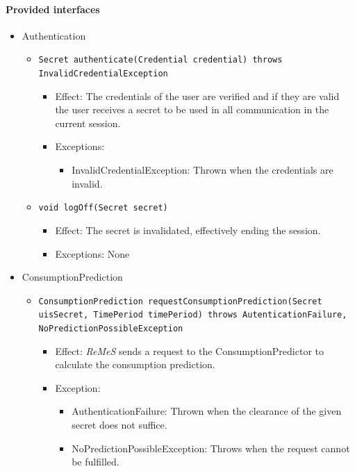 \documentclass[a4paper,10pt]{article}
\newcommand{\rem}{\emph{ReMeS}\xspace}
\begin{document}
\paragraph{Provided interfaces}
\begin{itemize}
    \item Authentication
    \begin{itemize}
    	\item \texttt{Secret authenticate(Credential credential) throws InvalidCredentialException}
        \begin{itemize}
        	\item Effect: The credentials of the user are verified and if they are valid the user receives a secret to be used in all communication in the current session.
            \item Exceptions:
            \begin{itemize}
            	\item InvalidCredentialException: Thrown when the credentials are invalid.
           	\end{itemize}
        \end{itemize}
        \item \texttt{void logOff(Secret secret)}
        \begin{itemize}
        	\item Effect: The secret is invalidated, effectively ending the session.
            \item Exceptions: None
        \end{itemize}
    \end{itemize}
    
        \item ConsumptionPrediction
    \begin{itemize}
    	\item \texttt{ConsumptionPrediction requestConsumptionPrediction(Secret uisSecret, TimePeriod timePeriod) throws AutenticationFailure,	NoPredictionPossibleException}
        \begin{itemize}
        	\item Effect: \rem sends a request to the ConsumptionPredictor to calculate the consumption prediction.
            \item Exception:
            \begin{itemize}
      		    \item AuthenticationFailure: Thrown when the clearance of the given secret does not suffice.
            	\item NoPredictionPossibleException: Throws when the request cannot be fulfilled.
            \end{itemize}
        \end{itemize}
    \end{itemize}
    

\end{itemize}
\end{document}
